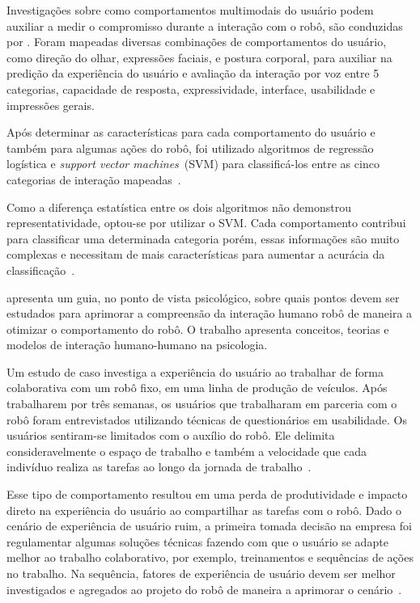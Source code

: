 Investigações sobre como comportamentos multimodais do usuário podem auxiliar a medir o compromisso durante a interação com o robô, são conduzidas por \textcite{jokinen:2015}. Foram mapeadas diversas combinações de comportamentos do usuário, como direção do olhar, expressões faciais, e postura corporal, para auxiliar na predição da experiência do usuário e avaliação da interação por voz entre 5 categorias, capacidade de resposta, expressividade, interface, usabilidade e impressões gerais.

Após determinar as características para cada comportamento do usuário e também para algumas ações do robô, foi utilizado algoritmos de regressão logística e \emph{support vector machines}~(SVM) para classificá-los entre as cinco categorias de interação mapeadas~\cite{jokinen:2015}.

Como a diferença estatística entre os dois algoritmos não demonstrou representatividade, optou-se por utilizar o SVM. Cada comportamento contribui para classificar uma determinada categoria porém, essas informações são muito complexas e necessitam de mais características para aumentar a acurácia da classificação~\cite{jokinen:2015}.

\textcite{broadbent:2016} apresenta um guia, no ponto de vista psicológico, sobre quais pontos devem ser estudados para aprimorar a compreensão da interação humano robô de maneira a otimizar o comportamento do robô. O trabalho apresenta conceitos, teorias e modelos de interação humano-humano na psicologia.

Um estudo de caso investiga a experiência do usuário ao trabalhar de forma colaborativa com um robô fixo, em uma linha de produção de veículos. Após trabalharem por três semanas, os usuários que trabalharam em parceria com o robô foram entrevistados utilizando técnicas de questionários em usabilidade. Os usuários sentiram-se limitados com o auxílio do robô. Ele delimita consideravelmente o espaço de trabalho e também a velocidade que cada indivíduo realiza as tarefas ao longo da jornada de trabalho~\cite{weiss:2016}.

Esse tipo de comportamento resultou em uma perda de produtividade e impacto direto na experiência do usuário ao compartilhar as tarefas com o robô. Dado o cenário de experiência de usuário ruim, a primeira tomada decisão na empresa foi regulamentar algumas soluções técnicas fazendo com que o usuário se adapte melhor ao trabalho colaborativo, por exemplo, treinamentos e sequências de ações no trabalho. Na sequência, fatores de experiência de usuário devem ser melhor investigados e agregados ao projeto do robô de maneira a aprimorar o cenário~\cite{weiss:2016}.

